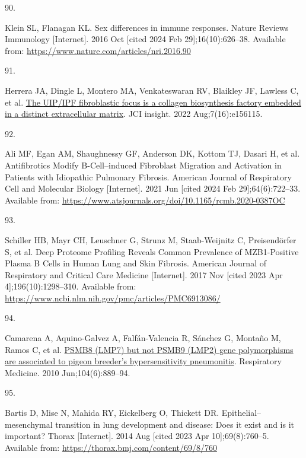 \documentclass[
]{article}
\newlength{\cslhangindent}
\newlength{\csllabelwidth}
\newenvironment{CSLReferences}[2] %
 {\begin{list}{}{%
  \setlength{\itemindent}{0pt}
  \setlength{\leftmargin}{0pt}
  \setlength{\parsep}{0pt}
  \ifodd #1
   \setlength{\leftmargin}{\cslhangindent}
   \setlength{\itemindent}{-1\cslhangindent}
  \fi
  \setlength{\itemsep}{#2\baselineskip}}}
 {\end{list}}
\newcommand{\CSLLeftMargin}[1]{\parbox[t]{\csllabelwidth}{\strut#1\strut}}
\newcommand{\CSLRightInline}[1]{\parbox[t]{\linewidth - \csllabelwidth}{\strut#1\strut}}
\begin{document}
\begin{CSLReferences}{0}{1}
\CSLLeftMargin{90. }%
\CSLRightInline{Klein SL, Flanagan KL. Sex differences in immune responses. Nature Reviews Immunology {[}Internet{]}. 2016 Oct {[}cited 2024 Feb 29{]};16(10):626--38. Available from: \url{https://www.nature.com/articles/nri.2016.90}}

\CSLLeftMargin{91. }%
\CSLRightInline{Herrera JA, Dingle L, Montero MA, Venkateswaran RV, Blaikley JF, Lawless C, et al. \href{https://doi.org/10.1172/jci.insight.156115}{The {UIP}/{IPF} fibroblastic focus is a collagen biosynthesis factory embedded in a distinct extracellular matrix}. JCI insight. 2022 Aug;7(16):e156115. }

\CSLLeftMargin{92. }%
\CSLRightInline{Ali MF, Egan AM, Shaughnessy GF, Anderson DK, Kottom TJ, Dasari H, et al. Antifibrotics {Modify} {B}-{Cell}--induced {Fibroblast} {Migration} and {Activation} in {Patients} with {Idiopathic} {Pulmonary} {Fibrosis}. American Journal of Respiratory Cell and Molecular Biology {[}Internet{]}. 2021 Jun {[}cited 2024 Feb 29{]};64(6):722--33. Available from: \url{https://www.atsjournals.org/doi/10.1165/rcmb.2020-0387OC}}

\CSLLeftMargin{93. }%
\CSLRightInline{Schiller HB, Mayr CH, Leuschner G, Strunz M, Staab-Weijnitz C, Preisendörfer S, et al. Deep {Proteome} {Profiling} {Reveals} {Common} {Prevalence} of {MZB1}-{Positive} {Plasma} {B} {Cells} in {Human} {Lung} and {Skin} {Fibrosis}. American Journal of Respiratory and Critical Care Medicine {[}Internet{]}. 2017 Nov {[}cited 2023 Apr 4{]};196(10):1298--310. Available from: \url{https://www.ncbi.nlm.nih.gov/pmc/articles/PMC6913086/}}

\CSLLeftMargin{94. }%
\CSLRightInline{Camarena A, Aquino-Galvez A, Falfán-Valencia R, Sánchez G, Montaño M, Ramos C, et al. \href{https://doi.org/10.1016/j.rmed.2010.01.014}{{PSMB8} ({LMP7}) but not {PSMB9} ({LMP2}) gene polymorphisms are associated to pigeon breeder's hypersensitivity pneumonitis}. Respiratory Medicine. 2010 Jun;104(6):889--94. }

\CSLLeftMargin{95. }%
\CSLRightInline{Bartis D, Mise N, Mahida RY, Eickelberg O, Thickett DR. Epithelial--mesenchymal transition in lung development and disease: Does it exist and is it important? Thorax {[}Internet{]}. 2014 Aug {[}cited 2023 Apr 10{]};69(8):760--5. Available from: \url{https://thorax.bmj.com/content/69/8/760}}


\end{CSLReferences}
\end{document}
